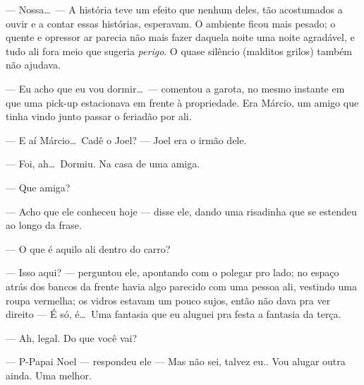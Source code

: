 --- Nossa\ldots \ --- A história teve um efeito que nenhum deles, tão acostumados a ouvir e a contar essas histórias, esperavam. O ambiente ficou mais pesado; o quente e opressor ar parecia não mais fazer daquela noite uma noite agradável, e tudo ali fora meio que sugeria \emph{perigo}. O quase silêncio (malditos grilos) também não ajudava.

--- Eu acho que eu vou dormir\ldots \ --- comentou a garota, no mesmo instante em que uma pick-up estacionava em frente à propriedade. Era Márcio, um amigo que tinha vindo junto passar o feriadão por ali.

--- E aí Márcio\ldots \ Cadê o Joel? --- Joel era o irmão dele.

--- Foi, ah\ldots \ Dormiu. Na casa de uma amiga.

--- Que amiga?

--- Acho que ele conheceu hoje --- disse ele, dando uma risadinha que se estendeu ao longo da frase.

--- O que é aquilo ali dentro do carro?

--- Isso aqui? --- perguntou ele, apontando com o polegar pro lado; no espaço atrás dos bancos da frente havia algo parecido com uma pessoa ali, vestindo uma roupa vermelha; os vidros estavam um pouco sujos, então não dava pra ver direito --- É só, é\ldots \ Uma fantasia que eu aluguei pra festa a fantasia da terça.

--- Ah, legal. Do que você vai?

--- P-Papai Noel --- respondeu ele --- Mas não sei, talvez eu.. Vou alugar outra ainda. Uma melhor.
